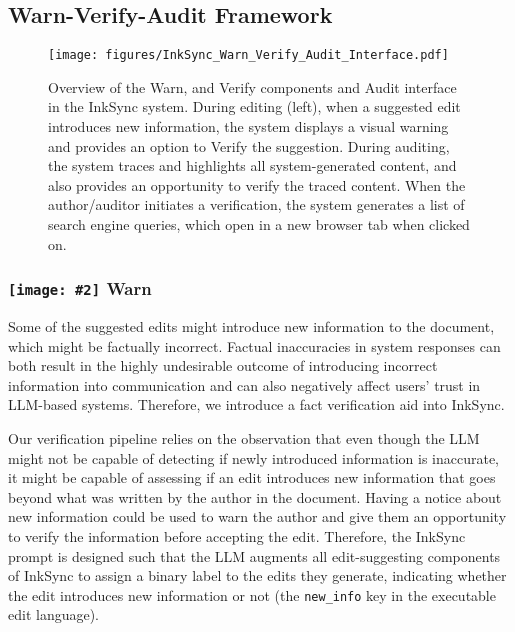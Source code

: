 \documentclass[manuscript]{acmart}
\newcommand{\symbolimg}[2][0.4cm]{%
  \texttt{[image: \#2]}%
}
\begin{document}
\subsection{Warn-Verify-Audit Framework} \label{sec:warn-verify-audit}

\begin{figure*}
    \centering
    \texttt{[image: figures/InkSync\_Warn\_Verify\_Audit\_Interface.pdf]}
    \caption{Overview of the Warn, and Verify components and Audit interface in the InkSync system. During editing (left), when a suggested edit introduces new information, the system displays a visual warning and provides an option to Verify the suggestion. During auditing, the system traces and highlights all system-generated content, and also provides an opportunity to verify the traced content. When the author/auditor initiates a verification, the system generates a list of search engine queries, which open in a new browser tab when clicked on.}
    \label{fig:warn_verify_audit}
\end{figure*}

\subsubsection{\symbolimg[0.3cm]{figures/icons/warn.png} Warn} \label{sec:warn}

Some of the suggested edits might introduce new information to the document, which might be factually incorrect. Factual inaccuracies in system responses can both result in the highly undesirable outcome of introducing incorrect information into communication and can also negatively affect users' trust in LLM-based systems. Therefore, we introduce a fact verification aid into InkSync.

Our verification pipeline relies on the observation that even though the LLM might not be capable of detecting if newly introduced information is inaccurate, it might be capable of assessing if an edit introduces new information that goes beyond what was written by the author in the document. Having a notice about new information could be used to warn the author and give them an opportunity to verify the information before accepting the edit.
Therefore, the InkSync prompt is designed such that the LLM augments all edit-suggesting components of InkSync to assign a binary label to the edits they generate, indicating whether the edit introduces new information or not (the \texttt{new\_info} key in the executable edit language).
\end{document}
